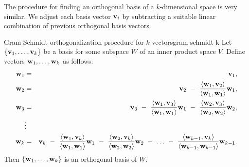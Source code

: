 The procedure for finding an orthogonal basis of a $k$-dimensional
space is very similar. We adjust each basis vector $\vect{v}_i$ by
subtracting a suitable linear combination of previous orthogonal basis
vectors.

\begin{proposition}{Gram-Schmidt orthogonalization procedure for $k$ vectors}{gram-schmidt-k}
  Let $\set{\vect{v}_1,\ldots,\vect{v}_k}$ be a basis for some subspace $W$
  of an inner product space $V$.%
  Define vectors
  $\vect{w}_1,\ldots,\vect{w}_k$ as follows:
  \begin{eqnarray*}
    \vect{w}_1
    &=& \vect{v}_1,
    \\
    \vect{w}_2
    &=& \vect{v}_2
        ~-~ \frac{\iprod{\vect{w}_1,\vect{v}_2}}{\iprod{\vect{w}_1,\vect{w}_1}}\vect{w}_1,
    \\
    \vect{w}_3
    &=& \vect{v}_3
        ~-~ \frac{\iprod{\vect{w}_1,\vect{v}_3}}{\iprod{\vect{w}_1,\vect{w}_1}}\vect{w}_1
        ~-~ \frac{\iprod{\vect{w}_2,\vect{v}_3}}{\iprod{\vect{w}_2,\vect{w}_2}}\vect{w}_2,
    \\
    &\vdots&
    \\
    \vect{w}_k
    &=& \vect{v}_k
        ~-~ \frac{\iprod{\vect{w}_1,\vect{v}_k}}{\iprod{\vect{w}_1,\vect{w}_1}}\vect{w}_1
        ~-~ \frac{\iprod{\vect{w}_2,\vect{v}_k}}{\iprod{\vect{w}_2,\vect{w}_2}}\vect{w}_2
        ~-~ \ldots
        ~-~ \frac{\iprod{\vect{w}_{k-1},\vect{v}_k}}{\iprod{\vect{w}_{k-1},\vect{w}_{k-1}}}\vect{w}_{k-1}.
  \end{eqnarray*}
  Then $\set{\vect{w}_1,\ldots,\vect{w}_k}$ is an orthogonal basis of $W$.
\end{proposition}

